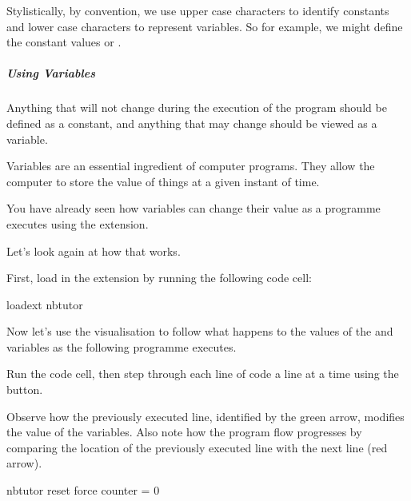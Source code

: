 \documentclass[letterpaper,10pt,english]{sphinxmanual}
\begin{document}
{Stylistically, by convention, we use upper case characters to identify constants and lower case characters to represent variables. So for example, we might define the constant values  or .


\subparagraph{Using Variables}
\label{\detokenize{content/01_Robot_Lab/Section_00_02:Using-Variables}}
Anything that will not change during the execution of the program should be defined as a constant, and anything that may change should be viewed as a variable.

Variables are an essential ingredient of computer programs. They allow the computer to store the value of things at a given instant of time.

You have already seen how variables can change their value as a programme executes using the  extension.

Let’s look again at how that works.

First, load in the  extension by running the following code cell:

{
\begin{sphinxVerbatim}[commandchars=\\\{\}]
\llap{\color{nbsphinxin}[ ]:\,\hspace{\fboxrule}\hspace{\fboxsep}}\PYGZpc{}load\PYGZus{}ext nbtutor
\end{sphinxVerbatim}
}

Now let’s use the  visualisation to follow what happens to the values of the  and  variables as the following programme executes.

Run the code cell, then step through each line of code a line at a time using the   button.

Observe how the previously executed line, identified by the green arrow, modifies the value of the variables. Also note how the program flow progresses by comparing the location of the previously executed line with the next line (red arrow).

{
\begin{sphinxVerbatim}[commandchars=\\\{\}]
\llap{\color{nbsphinxin}[ ]:\,\hspace{\fboxrule}\hspace{\fboxsep}}\PYGZpc{}\PYGZpc{}nbtutor \PYGZhy{}\PYGZhy{}reset \PYGZhy{}\PYGZhy{}force
counter = 0


\end{sphinxVerbatim}}}
\end{document}
